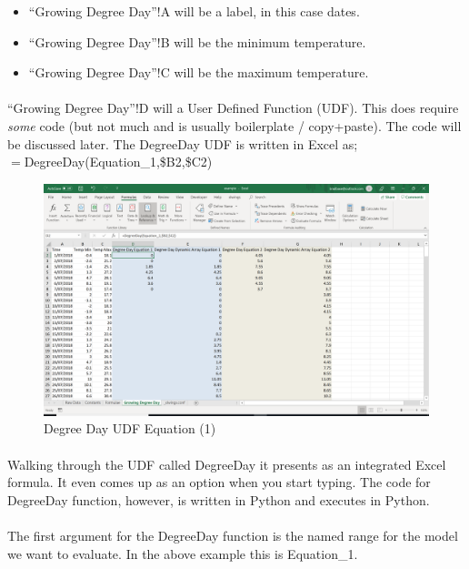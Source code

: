 \documentclass[12pt,a4paper,twoside,openright,titlepage]{article}
\begin{document}
\begin{itemize}
	\item ``Growing Degree Day''!A will be a label, in this case dates.
	\item ``Growing Degree Day''!B will be the minimum temperature.
	\item ``Growing Degree Day''!C will be the maximum temperature.
\end{itemize}

\paragraph{} ``Growing Degree Day''!D will a User Defined Function (UDF). This does require \textsl{some} code (but not much and is usually boilerplate / copy+paste). The code will be discussed later. The DegreeDay UDF is written in Excel as;\\

$=$DegreeDay(Equation\_1,\$B2,\$C2) 

\begin{figure}[h!]
	\centering
	\includegraphics[scale=0.4]{images/degreeday_equation_1.PNG}
	\caption{Degree Day UDF Equation (1)}
\end{figure}

\paragraph{} Walking through the UDF called DegreeDay it presents as an integrated Excel formula. It even comes up as an option when you start typing. The code for DegreeDay function, however, is written in Python and executes in Python.

\paragraph{} The first argument for the DegreeDay function is the named range for the model we want to evaluate. In the above example this is Equation\_1.
\end{document}
